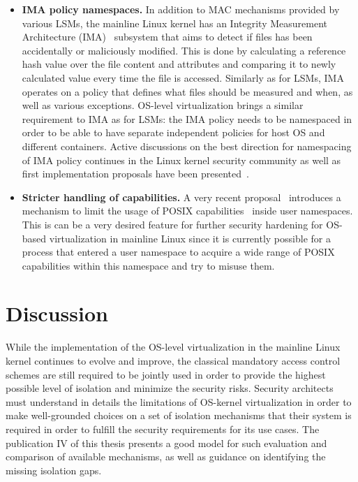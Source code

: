 \begin{itemize}
	\item \textbf{IMA policy namespaces.} In addition to MAC mechanisms provided by various LSMs, the mainline Linux kernel has an Integrity Measurement Architecture (IMA)~\cite{ima} subsystem that aims to detect if files has been accidentally or maliciously modified. This is done by calculating a reference hash value over the file content and attributes and comparing it to newly calculated value every time the file is accessed. Similarly as for LSMs, IMA operates on a policy that defines what files should be measured and when, as well as various exceptions. OS-level virtualization brings a similar requirement to IMA as for LSMs: the IMA policy needs to be namespaced in order to be able to have separate independent policies for host OS and different containers. Active discussions on the best direction for namespacing of IMA policy continues in the Linux kernel security community as well as first implementation proposals have been presented~\cite{magalhaes2017}. 
	\item \textbf{Stricter handling of capabilities.} A very recent proposal~\cite{Bandewar2017} introduces a mechanism to limit the usage of POSIX capabilities~\cite{caps} inside user namespaces. This is can be a very desired feature for further security hardening for OS-based virtualization in mainline Linux since it is currently possible for a process that entered a user namespace to acquire a wide range of POSIX capabilities within this namespace and try to misuse them. 
\end{itemize}


\section{Discussion}

While the implementation of the OS-level virtualization in the mainline Linux kernel continues to evolve and improve, the classical mandatory access control schemes are still required to be jointly used in order to provide the highest possible level of isolation and minimize the security risks. Security architects must understand in details the limitations of OS-kernel virtualization in order to make well-grounded choices on a set of isolation mechanisms that their system is required in order to fulfill the security requirements for its use cases. The publication IV of this thesis presents a good model for such evaluation and comparison of available mechanisms, as well as guidance on identifying the missing isolation gaps. 

